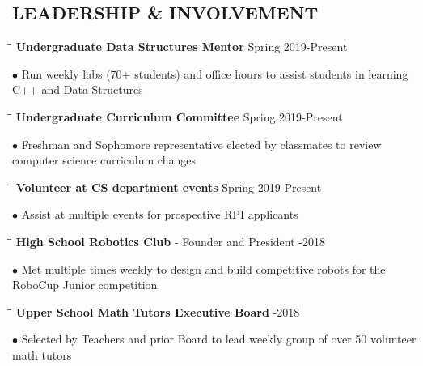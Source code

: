 \documentclass{res}
\begin{document}
\begin{resume}
\section{LEADERSHIP \& INVOLVEMENT}
	\vspace{-0.1in}
	\begin{tabbing}
   \hspace{2.3in}\= \hspace{3.4in}\= \kill
    {\bf Undergraduate Data Structures Mentor} \>  \>Spring 2019-Present
   \end{tabbing}\vspace{-20pt}
	$\bullet$ Run weekly labs (70+ students) and office hours to assist students in learning C++ and Data Structures
    \vspace{-15pt}
    \begin{tabbing}
   \hspace{2.3in}\= \hspace{3.4in}\= \kill
    {\bf Undergraduate Curriculum Committee} \>  \>Spring 2019-Present
   \end{tabbing}\vspace{-20pt}
	$\bullet$ Freshman and Sophomore representative elected by classmates to review computer science curriculum changes
	\vspace{-15pt}
    \begin{tabbing}
   \hspace{2.3in}\= \hspace{3.4in}\= \kill
    {\bf Volunteer at CS department events} \>  \>Spring 2019-Present
   \end{tabbing}\vspace{-20pt}
	 $\bullet$ Assist at multiple events for prospective RPI applicants
	 \vspace{-15pt}
    \begin{tabbing}
   \hspace{2.3in}\= \hspace{4in}\= \kill
    {\bf High School Robotics Club} - Founder and President \>  -2018
   \end{tabbing}\vspace{-20pt}
	 $\bullet$ Met multiple times weekly to design and build competitive robots for the RoboCup Junior competition
    \vspace{-15pt}
    \begin{tabbing}
   \hspace{2.3in}\= \hspace{4in}\= \kill
    {\bf Upper School Math Tutors Executive Board} \>  -2018
   \end{tabbing}\vspace{-20pt}
	 $\bullet$ Selected by Teachers and prior Board to lead weekly group of over 50 volunteer math tutors



\end{resume}
\end{document}
